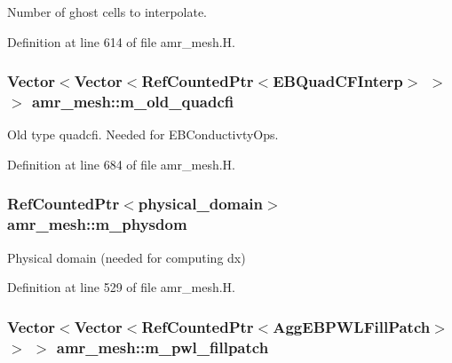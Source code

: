 Number of ghost cells to interpolate. 



Definition at line 614 of file amr\+\_\+mesh.\+H.

\subsubsection[{\texorpdfstring{m\+\_\+old\+\_\+quadcfi}{m_old_quadcfi}}]{\setlength{\rightskip}{0pt plus 5cm}Vector$<$Vector$<$Ref\+Counted\+Ptr$<$E\+B\+Quad\+C\+F\+Interp$>$ $>$ $>$ amr\+\_\+mesh\+::m\+\_\+old\+\_\+quadcfi\hspace{0.3cm}{\ttfamily [protected]}}\hypertarget{classamr__mesh_a94acf57b52f92a8ef5aee7b2ccb0239a}{}\label{classamr__mesh_a94acf57b52f92a8ef5aee7b2ccb0239a}


Old type quadcfi. Needed for E\+B\+Conductivty\+Ops. 



Definition at line 684 of file amr\+\_\+mesh.\+H.

\subsubsection[{\texorpdfstring{m\+\_\+physdom}{m_physdom}}]{\setlength{\rightskip}{0pt plus 5cm}Ref\+Counted\+Ptr$<${\bf physical\+\_\+domain}$>$ amr\+\_\+mesh\+::m\+\_\+physdom\hspace{0.3cm}{\ttfamily [protected]}}\hypertarget{classamr__mesh_a151c0e5d28e637c42e9d8b912aa1d5e8}{}\label{classamr__mesh_a151c0e5d28e637c42e9d8b912aa1d5e8}


Physical domain (needed for computing dx) 



Definition at line 529 of file amr\+\_\+mesh.\+H.

\subsubsection[{\texorpdfstring{m\+\_\+pwl\+\_\+fillpatch}{m_pwl_fillpatch}}]{\setlength{\rightskip}{0pt plus 5cm}Vector$<$Vector$<$Ref\+Counted\+Ptr$<$Agg\+E\+B\+P\+W\+L\+Fill\+Patch$>$ $>$ $>$ amr\+\_\+mesh\+::m\+\_\+pwl\+\_\+fillpatch\hspace{0.3cm}{\ttfamily [protected]}}\hypertarget{classamr__mesh_add41fea333026b33f25ae039bad5c55a}{}\label{classamr__mesh_add41fea333026b33f25ae039bad5c55a}


